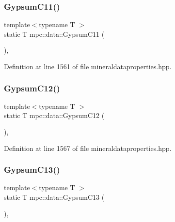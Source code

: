 \subsubsection{\texorpdfstring{Gypsum\+C11()}{GypsumC11()}}
{\footnotesize\ttfamily template$<$typename T $>$ \\
static T mpc\+::data\+::\+Gypsum\+C11 (\begin{DoxyParamCaption}{ }\end{DoxyParamCaption})\hspace{0.3cm}{\ttfamily [inline]}, {\ttfamily [static]}}



Definition at line 1561 of file mineraldataproperties.\+hpp.

\mbox{\label{namespacempc_1_1data_a6e87524023885d590744ed69c50879db}} 
\subsubsection{\texorpdfstring{Gypsum\+C12()}{GypsumC12()}}
{\footnotesize\ttfamily template$<$typename T $>$ \\
static T mpc\+::data\+::\+Gypsum\+C12 (\begin{DoxyParamCaption}{ }\end{DoxyParamCaption})\hspace{0.3cm}{\ttfamily [inline]}, {\ttfamily [static]}}



Definition at line 1567 of file mineraldataproperties.\+hpp.

\mbox{\label{namespacempc_1_1data_a4e61deb51d3208e0781f9e3b832e3192}} 
\subsubsection{\texorpdfstring{Gypsum\+C13()}{GypsumC13()}}
{\footnotesize\ttfamily template$<$typename T $>$ \\
static T mpc\+::data\+::\+Gypsum\+C13 (\begin{DoxyParamCaption}{ }\end{DoxyParamCaption})\hspace{0.3cm}{\ttfamily [inline]}, {\ttfamily [static]}}



